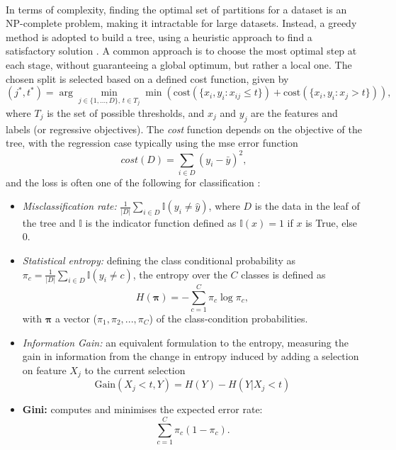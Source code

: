 \paragraph{}In terms of complexity, finding the optimal set of partitions for a dataset is an NP-complete problem, making it intractable for large datasets. Instead, a greedy method is adopted to build a tree, using a heuristic approach to find a satisfactory solution \cite{MurphyML}. A common approach is to choose the most optimal step at each stage, without guaranteeing a global optimum, but rather a local one. The chosen split is selected based on a defined cost function, given by
\begin{equation}\label{eq:DTcost}
    (j^*, t^*) = \arg\min_{j\in \{1, ..., D\},\, t \in T_j} \min \left(\text{cost} (\{x_i, y_i : x_{ij} \leq t\}) + \text{cost}(\{x_i, y_i : x_j > t\}) \right),
\end{equation}
where $T_j$ is the set of possible thresholds, and $x_j$ and $y_j$ are the features and labels (or regressive objectives). The \textit{cost} function depends on the objective of the tree, with the regression case typically using the \gls{mse} error function \[cost(D) = \sum_{i\in D}(y_i - \bar{y})^2,\] and the loss is often one of the following for classification \cite{MurphyML}:
\begin{itemize}
    \item \textit{Misclassification rate:} $\frac{1}{|D|} \sum_{i \in D} \mathbb{I}(y_i \neq \hat{y})$, where $D$ is the data in the leaf of the tree and $\mathbb{I}$ is the indicator function defined as $\mathbb{I}(x) = 1$ if $x$ is True, else $0$. 
    \item \textit{Statistical entropy:} defining the class conditional probability as $\pi_c = \frac{1}{|D|} \sum_{i \in D} \mathbb{I}(y_i \neq c)$, the entropy over the $C$ classes is defined as
    \begin{equation}\label{eq:statEntropy}
        H(\boldsymbol{\pi}) = - \sum_{c=1}^C \pi_c \log \pi_c,
    \end{equation}
    with $\boldsymbol{\pi}$ a vector ($\pi_1, \pi_2, ..., \pi_C$) of the class-condition probabilities.
    \item \textit{Information Gain:} an equivalent formulation to the entropy, measuring the gain in information from the change in entropy induced by adding a selection on feature $X_j$ to the current selection 
    \[ \text{Gain}(X_j < t, Y) = H(Y) - H(Y | X_j < t) \]
    \item \textbf{Gini:} computes and minimises the expected error rate:
    \begin{equation}\label{eq:giniClass} 
        \sum_{c=1}^C \pi_c (1 - \pi_c).
    \end{equation}
\end{itemize}

